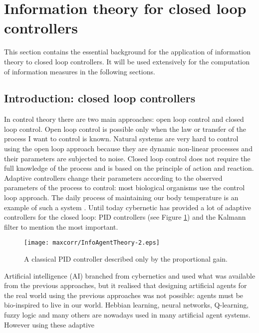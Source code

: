 
\section{Information theory for closed loop controllers}
\label{Introduction:InfoTheoryClosedLoop}
This section contains the essential background for the application of information
theory to closed loop controllers.
It will be used extensively for the computation of information measures in the 
following sections.

\subsection{Introduction: closed loop controllers}
In control theory there are two main approaches: open loop control and closed
loop control. Open loop control is possible only when the law or transfer of the
 process I want to control is known. Natural systems are very hard to control
using the open loop approach because they are dynamic non-linear processes and
their parameters are subjected to noise. Closed loop control does not require
the full knowledge of the process and is based on the principle of action and reaction.
Adaptive controllers change their parameters according to the observed parameters of
the process to control: most biological organisms use the control loop approach.
The daily process of maintaining our body temperature is an example of such a system \citep{HumanBody}.
Until today cybernetic has provided a lot of adaptive controllers for the closed loop:
PID controllers
(see Figure \ref{Figure:maxcorr:PID}) and the Kalmann filter to mention the most important.
\begin{figure}[ht]
  \begin{center}
    \texttt{[image: maxcorr/InfoAgentTheory-2.eps]}
    \caption[Classical PID controller]{
	     A classical PID controller described only by the proportional gain.
	      \label{Figure:maxcorr:PID}}
  \end{center}
\end{figure}
Artificial intelligence (AI) branched from cybernetics and used what was available
from the previous approaches, but it realised that designing artificial agents
for the real world using the previous
approaches was not possible: agents must be bio-inspired to live in our world.
Hebbian learning, neural networks, Q-learning, fuzzy logic and many others are
nowadays used in many artificial agent systems. However using these adaptive
